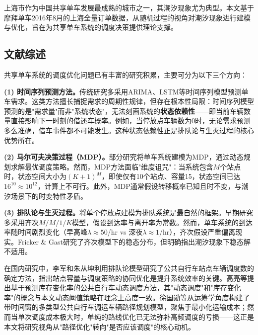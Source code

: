 \documentclass[12pt,a4paper]{article}
\begin{document}
上海市作为中国共享单车发展最成熟的城市之一，其潮汐现象尤为典型。本文基于摩拜单车2016年8月的上海全量订单数据，从随机过程的视角对潮汐现象进行建模与优化，旨在为共享单车系统的调度决策提供理论支撑。

\subsection{文献综述}

共享单车系统的调度优化问题已有丰富的研究积累，主要可分为以下三个方向：

\textbf{(1) 时间序列预测方法。}传统研究多采用ARIMA、LSTM等时间序列模型预测单车需求。这类方法擅长捕捉需求的周期性规律，但存在根本性局限：时间序列模型预测的是"需求量"而非"系统状态"，无法刻画系统的\textbf{状态依赖性}——即当前车辆数量直接影响下一时刻的借还车概率。例如，当停放点车辆数为0时，无论需求预测多么准确，借车事件都不可能发生。这种状态依赖性正是排队论与生灭过程的核心优势所在。

\textbf{(2) 马尔可夫决策过程（MDP）。}部分研究将单车系统建模为MDP，通过动态规划求解最优调度策略\cite{shu2013}。然而，MDP方法面临"维度诅咒"：当系统包含$M$个站点时，状态空间大小为$(K+1)^M$，即使仅有10个站点、容量15，状态空间已达$16^{10} \approx 10^{12}$，计算上不可行。此外，MDP通常假设转移概率已知且时不变，与潮汐场景下的时变特性矛盾。

\textbf{(3) 排队论与生灭过程。}将单个停放点建模为排队系统是最自然的框架\cite{raviv2013}\cite{kleinrock1975}。早期研究多采用齐次$M/M/1/K$模型，假设到达率与离开率为常数。然而，单车系统的到达率随时间剧烈变化（早高峰$\lambda \approx 50$/hr vs 深夜$\lambda \approx 1$/hr），齐次假设严重偏离现实。Fricker \& Gast\cite{fricker2016}研究了齐次模型下的稳态分布，但明确指出潮汐现象下稳态解不适用。

在国内研究中，李军和朱从坤\cite{li2019}利用排队论模型研究了公共自行车站点车辆调度数的确定方法，指出站点容量与调度策略的协同优化是提升系统效率的关键。高亮等\cite{gao2019}提出基于预测库存变化率的公共自行车动态调度方法，其"动态调度"和"库存变化率"的概念与本文动态阈值策略在理念上高度一致。徐国勋等\cite{xu2019vrp}从运筹学角度构建了带时间窗的多类型公共自行车调运车辆路径规划模型，聚焦于最小化运输成本；然而当单次调度成本极大时，单纯的路线优化已无法弥补高频调度的亏损——这正是本文将研究视角从"路径优化"转向"是否应该调度"的核心动机。
\end{document}
